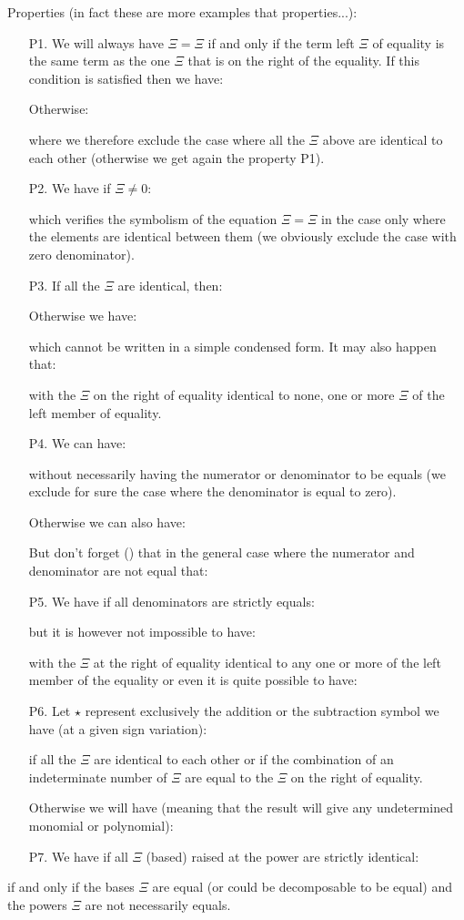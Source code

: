 	Properties (in fact these are more examples that properties...):
	\begin{enumerate}
		\item[P1.] We will always have $\Xi=\Xi$ if and only if the term left $\Xi$ of equality is the same term as the one $\Xi$  that is on the right of the equality. If this condition is satisfied then we have:
		
		Otherwise:
		
		where we therefore exclude the case where all the $\Xi$ above are identical to each other (otherwise we get again the property P1).
		\item[P2.] We have if $\Xi\neq 0$:
		
		which verifies the symbolism of the equation $\Xi=\Xi$ in the case only where the elements are identical between them (we obviously exclude the case with zero denominator).
	
		\item[P3.] \label{power rules calculations}If all the $\Xi$  are identical, then:
				
		Otherwise we have:
		
		which cannot be written in a simple condensed form. It may also happen that:
		
		with the $\Xi$ on the right of equality identical to none, one or more $\Xi$ of the left member of equality.

		\item[P4.] We can have:
		
		without necessarily having the numerator or denominator to be equals (we exclude for sure the case where the denominator is equal to zero).

		Otherwise we can also have:
		
		But don't forget () that in the general case where the numerator and denominator are not equal that:
		
		
		\item[P5.] We have if all denominators are strictly equals:
		
but it is however not impossible to have:
		
with the $\Xi$ at the right of equality identical to any one or more of the left member of the equality or even it is quite possible to have:
		

		\item[P6.] Let $\star$ represent exclusively the addition or the subtraction symbol we have (at a given sign variation):
		
		if all the $\Xi$ are identical to each other or if the combination of an indeterminate number of $\Xi$ are equal to the $\Xi$ on the right of equality.

		Otherwise we will have (meaning that the result will give any undetermined monomial or polynomial):
		

		\item[P7.] We have if all $\Xi$ (based) raised at the power are strictly identical:
		
	\end{enumerate}
	if and only if the bases $\Xi$ are equal (or could be decomposable to be equal) and the powers $\Xi$ are not  necessarily equals.


